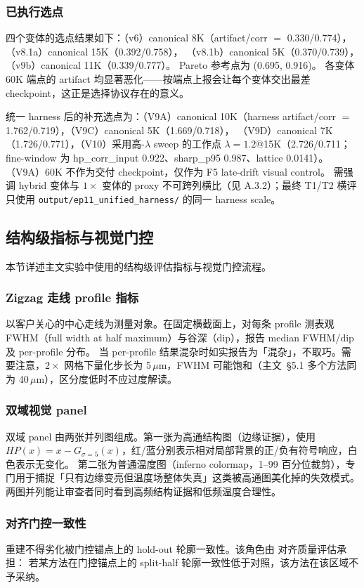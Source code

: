 \subsubsection{已执行选点}

 四个变体的选点结果如下：（v6）canonical 8K（artifact/corr \(=\) 0.330/0.774），（v8.1a）canonical 15K（0.392/0.758），
（v8.1b）canonical 5K（0.370/0.739），（v9b）canonical 11K（0.339/0.777）。 Pareto 参考点为 (0.695, 0.916)。
各变体 60K 端点的 artifact 均显著恶化——按端点上报会让每个变体交出最差 checkpoint，这正是选择协议存在的意义。

统一 harness 后的补充选点为：（V9A）canonical 10K（harness artifact/corr \(=\) 1.762/0.719），（V9C）canonical 5K（1.669/0.718），
（V9D）canonical 7K（1.726/0.771），（V10）采用高-\(\lambda\) sweep 的工作点 \(\lambda=1.2\)@15K（2.726/0.711；fine-window 为 hp\_corr\_input 0.922、sharp\_p95 0.987、lattice 0.0141）。
（V9A）60K 不作为交付 checkpoint，仅作为 F5 late-drift visual control。
需强调 hybrid 变体与 \(1\times\) 变体的 proxy 不可跨列横比（见 A.3.2）；最终 T1/T2 横评只使用 \texttt{output/ep11\_unified\_harness/} 的同一 harness scale。

\subsection{结构级指标与视觉门控}

本节详述主文实验中使用的结构级评估指标与视觉门控流程。

\subsubsection{Zigzag 走线 profile 指标}

以客户关心的中心走线为测量对象。在固定横截面上，对每条 profile 测表观 FWHM（full width at half maximum）与谷深（dip），报告 median FWHM/dip 及 per-profile 分布。
当 per-profile 结果混杂时如实报告为「混杂」，不取巧。需要注意，\(2\times\) 网格下量化步长为 5\,\(\mu\)m，FWHM 可能饱和（主文~\S5.1 多个方法同为 40\,\(\mu\)m），区分度低时不应过度解读。

\subsubsection{双域视觉 panel}

双域 panel 由两张并列图组成。第一张为高通结构图（边缘证据），使用 \(HP(x) = x - G_{\sigma=5}(x)\)，红/蓝分别表示相对局部背景的正/负有符号响应，白色表示无变化。
第二张为普通温度图（inferno colormap，1--99 百分位裁剪），专门用于捕捉「只有边缘变亮但温度场整体失真」这类被高通图美化掉的失效模式。
两图并列能让审查者同时看到高频结构证据和低频温度合理性。

\subsubsection{对齐门控一致性}

重建不得劣化被门控锚点上的 hold-out 轮廓一致性。该角色由  对齐质量评估承担：
若某方法在门控锚点上的 split-half 轮廓一致性低于对照，该方法在该区域不予采纳。
